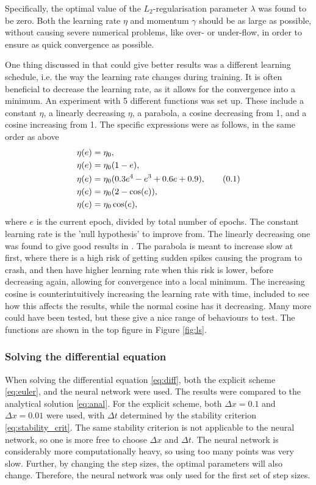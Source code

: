 \documentclass[multicolumn, 9pt]{extarticle}
\newcommand\numberthis{\addtocounter{equation}{1}\tag{\theequation}}
\begin{document}
Specifically, the optimal value of the $L_2$-regularisation parameter $\lambda$ was found to be zero. Both the learning rate $\eta$ and momentum $\gamma$ should be as large as possible, without causing severe numerical problems, like over- or under-flow, in order to ensure as quick convergence as possible.

One thing discussed in \cite{p2HO} that could give better results was a different learning schedule, i.e. the way the learning rate changes during training. It is often beneficial to decrease the learning rate, as it allows for the convergence into a minimum. An experiment with 5 different functions was set up. These include a constant $\eta$, a linearly decreasing $\eta$, a parabola, a cosine decreasing from 1, and a cosine increasing from 1.
The specific expressions were as follows, in the same order as above
\begin{align*}\label{eq:ls}
	\eta(e) & = \eta_0,
	\\
	\eta(e) & = \eta_0 (1 - e),
	\\
	\eta(e) & = \eta_0 (0.3e^4-e^3+0.6e+0.9), \numberthis
	\\
	\eta(e) & = \eta_0 (2 - \cos(e)),
	\\
	\eta(e) & = \eta_0 \cos(e),
\end{align*}
where $e$ is the current epoch, divided by total number of epochs. The constant learning rate is the 'null hypothesis' to improve from. The linearly decreasing one was found to give good results in \cite{p2HO}. The parabola is meant to increase slow at first, where there is a high risk of getting sudden spikes causing the program to crash, and then have higher learning rate when this risk is lower, before decreasing again, allowing for convergence into a local minimum. The increasing cosine is counterintuitively increasing the learning rate with time, included to see how this affects the results, while the normal cosine has it decreasing. Many more could have been tested, but these give a nice range of behaviours to test. The functions are shown in the top figure in Figure \ref{fig:ls}.

\subsubsection{Solving the differential equation}
When solving the differential equation \eqref{eq:diff}, both the explicit scheme \eqref{eq:euler}, and the neural network were used. The results were compared to the analytical solution \eqref{eq:anal}. For the explicit scheme, both $\Delta x=0.1$ and $\Delta x=0.01$ were used, with $\Delta t$ determined by the stability criterion \eqref{eq:stability_crit}. The same stability criterion is not applicable to the neural network, so one is more free to choose $\Delta x$ and $\Delta t$. The neural network is considerably more computationally heavy, so using too many points was very slow. Further, by changing the step sizes, the optimal parameters will also change. Therefore, the neural network was only used for the first set of step sizes.
\end{document}
